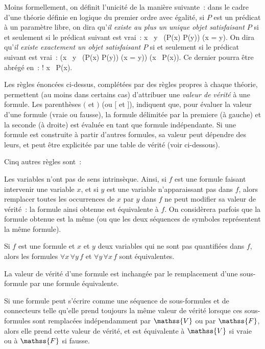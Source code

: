 Moins formellement, on définit l'unicité de la manière suivante : dans le cadre d'une théorie définie en logique du premier ordre avec égalité, si $P$ est un prédicat à un paramètre libre, on dira qu'\emph{il existe au plus un unique objet satisfaisant $P$} si et seulement si le prédicat suivant est vrai : 
\startformula
  \forall x \, \forall y \, (P(x) \wedge P(y)) \Rightarrow (x = y).
\stopformula
On dira qu'\emph{il existe exactement un objet satisfaisant $P$} si et seulement si le prédicat suivant est vrai :
\startformula
  (\forall x \, \forall y \, (P(x) \wedge P(y)) \Rightarrow (x = y)) \wedge (\exists x \, P(x)).
\stopformula
Ce dernier pourra être abrégé en : 
\startformula
  \exists! x \, P(x).
\stopformula

\stopsubsection


\startsubsection[title=Sémantique]

Les règles énoncées ci-dessus, complétées par des règles propres à chaque théorie, permettent (au moins dans certains cas) d'attribuer une \emph{valeur de vérité} à une formule. Les parenthèses $($ et $)$ (ou $[$ et $]$), indiquent que, pour évaluer la valeur d'une formule (vraie ou fausse), la formule délimitée par la premiere (à gauche) et la seconde (à droite) est évaluée en tant que formule indépendante. 
Si une formule est construite à partir d'autres formules, sa valeur peut dépendre des leurs, et peut être explicitée par une table de vérité (voir ci-dessous). 

Cinq autres règles sont :
\startitemize
  \item Les variables n'ont pas de sens intrinsèque. 
  Ainsi, si $f$ est une formule faisant intervenir une variable $x$, et si $y$ est une variable n'apparaissant pas dans $f$, alors remplacer toutes les occurrences de $x$ par $y$ dans $f$ ne peut modifier sa valeur de vérité : la formule ainsi obtenue est équivalente à $f$.
  On considèrera parfois que la formule obtenue est la même (ou que les deux séquences de symboles représentent la même formule). 
  \item Si $f$ est une formule et $x$ et $y$ deux variables qui ne sont pas quantifiées dans $f$, alors les formules $\forall x \, \forall y \, f$ et $\forall y \, \forall x \, f$ sont équivalentes.
  \item La valeur de vérité d'une formule est inchangée par le remplacement d'une sous-formule par une formule équivalente.
  \item Si une formule peut s'écrire comme une séquence de sous-formules et de connecteurs telle qu'elle prend toujours la même valeur de vérité lorsque ces sous-formules sont remplacées indépendamment par $\mathss{V}$ ou par $\mathss{F}$, alors elle prend cette valeur de vérité, et est équivalente à $\mathss{V}$ si vraie ou à $\mathss{F}$ si fausse.
\stopitemize

